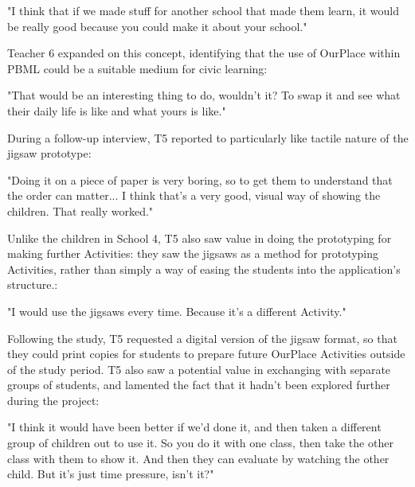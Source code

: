 \begin{displayquote}
"I think that if we made stuff for another school that made them learn, it would be really good because you could make it about your school."
\end{displayquote}

Teacher 6 expanded on this concept, identifying that the use of OurPlace within PBML could be a suitable medium for civic learning: 

\begin{displayquote}
"That would be an interesting thing to do, wouldn't it? To swap it and see what their daily life is like and what yours is like." 
\end{displayquote}

During a follow-up interview, T5 reported to particularly like tactile nature of the jigsaw prototype: 

\begin{displayquote}
"Doing it on a piece of paper is very boring, so to get them to understand that the order can matter... I think that's a very good, visual way of showing the children. That really worked."
\end{displayquote}

Unlike the children in School 4, T5 also saw value in doing the prototyping for making further Activities: they saw the jigsaws as a method for prototyping Activities, rather than simply a way of easing the students into the application's structure.: 

\begin{displayquote}
"I would use the jigsaws every time. Because it's a different Activity."
\end{displayquote}

Following the study, T5 requested a digital version of the jigsaw format, so that they could print copies for students to prepare future OurPlace Activities outside of the study period. T5 also saw a potential value in exchanging with separate groups of students, and lamented the fact that it hadn't been explored further during the project: 

\begin{displayquote}
"I think it would have been better if we'd done it, and then taken a different group of children out to use it. So you do it with one class, then take the other class with them to show it. And then they can evaluate by watching the other child. But it's just time pressure, isn't it?"
\end{displayquote}

